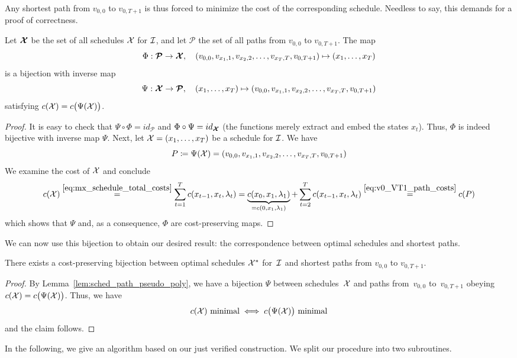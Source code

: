 Any shortest path from $v_{0,0}$ to $v_{0,T+1}$ is thus forced to minimize the cost of the corresponding schedule. Needless to say, this demands for a proof of correctness.
\begin{lem}\label{lem:sched_path_pseudo_poly}
Let $\bm{\mathcal{X}}$ be the set of all schedules $\mathcal{X}$ for $\mathcal{I}$, and let $\bm{\mathcal{P}}$ the set of all paths from $v_{0,0}$ to $v_{0,T+1}$. The map
\begin{equation*}
	\Phi:\bm{\mathcal{P}}\rightarrow\bm{\mathcal{X}},\quad (v_{0,0},v_{x_1,1},v_{x_2,2},\dotsc,v_{x_T,T},v_{0,T+1})\mapsto (x_1,\dotsc,x_T)
\end{equation*}
is a bijection with inverse map
\begin{equation*}
	\Psi:\bm{\mathcal{X}}\rightarrow\bm{\mathcal{P}},\quad(x_1,\dotsc,x_T)\mapsto (v_{0,0},v_{x_1,1},v_{x_2,2},\dotsc,v_{x_T,T},v_{0,T+1})
\end{equation*}
satisfying $c(\mathcal{X})=c\bigl(\Psi(\mathcal{X})\bigr)$.
\end{lem}
\begin{proof}
It is easy to check that $\Psi\circ\Phi=id_{\bm{\mathcal{P}}}$ and $\Phi\circ\Psi=id_{\bm{\mathcal{X}}}$ (the functions merely extract and embed the states $x_t$). Thus, $\Phi$ is indeed bijective with inverse map $\Psi$. Next, let $\mathcal{X}=(x_1,\dotsc,x_T)$ be a schedule for $\mathcal{I}$. We have
\begin{equation*}
	P\coloneqq\Psi(\mathcal{X})=(v_{0,0},v_{x_1,1},v_{x_2,2},\dotsc,v_{x_T,T},v_{0,T+1})
\end{equation*}
We examine the cost of $\mathcal{X}$ and conclude
\begin{equation*}
c(\mathcal{X})\stackrel{\eqref{eq:mx_schedule_total_costs}}{=}\sum\limits_{t=1}^{T}c(x_{t-1},x_{t},\lambda_t)=\underbrace{c(x_0,x_1,\lambda_1)}_{=c(0,x_1,\lambda_1)}+\sum\limits_{t=2}^{T}c(x_{t-1},x_{t},\lambda_t)\stackrel{\eqref{eq:v0_VT1_path_costs}}{=}c(P)
\end{equation*}
which shows that $\Psi$ and, as a consequence, $\Phi$ are cost-preserving maps.
\end{proof}
We can now use this bijection to obtain our desired result: the correspondence between optimal schedules and shortest paths.
\begin{thm}\label{thm:opt_sched_short_path_pseudo_poly}
There exists a cost-preserving bijection between optimal schedules $\mathcal{X}^*$ for~$\mathcal{I}$ and shortest paths from $v_{0,0}$ to $v_{0,T+1}$.
\end{thm} 
\begin{proof}
By Lemma~\ref{lem:sched_path_pseudo_poly}, we have a bijection $\Psi$ between schedules~$\mathcal{X}$ and paths from~$v_{0,0}$ to~$v_{0,T+1}$ obeying $c(\mathcal{X})=c\bigl(\Psi(\mathcal{X})\bigr)$. Thus, we have 
\begin{equation*}
	c(\mathcal{X})\text{ minimal}\iff c\bigl(\Psi(\mathcal{X})\big)\text{ minimal}
\end{equation*}
and the claim follows.
\end{proof}
In the following, we give an algorithm based on our just verified construction. 
We split our procedure into two subroutines. 

